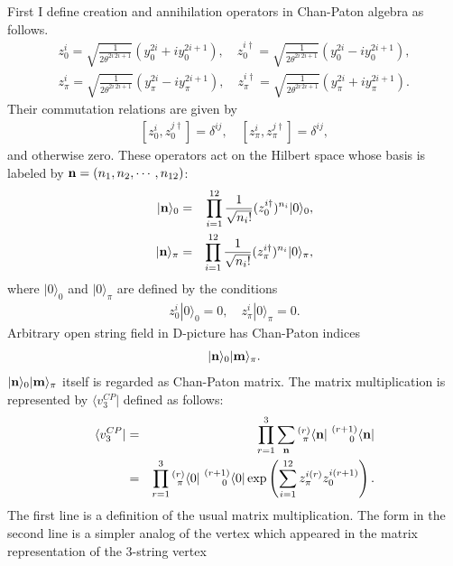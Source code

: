 \documentclass[a4paper,12pt]{article}
\newcommand{\nn}{\nonumber\\}
\def\bra{\langle}
\def\ket{\rangle}
\begin{document}
First I define creation and annihilation
operators in Chan-Paton algebra 
as follows.
\begin{eqnarray}
 \label{zs}
z_0^{i} = 
 \sqrt{\frac{1}{2\theta^{2i\,2i+1}}} 
 \left(
   y^{2i}_0 + i y_0^{2i+1}
 \right), \quad
z^{i \dagger}_0 = 
 \sqrt{\frac{1}{2\theta^{2i\,2i+1}}} 
 \left(
  y^{2i}_0 - i y_0^{2i+1}
 \right), \nn
z_\pi^{i} = 
 \sqrt{\frac{1}{2\theta^{2i\,2i+1}}} 
 \left(
  y^{2i}_\pi - i y_\pi^{2i+1}
 \right), \quad
z^{i \dagger}_\pi =  
 \sqrt{\frac{1}{2\theta^{2i\,2i+1}}} 
  \left(
    y^{2i}_\pi + i y_\pi^{2i+1}
\right).
\end{eqnarray}
Their commutation relations are given by
\begin{eqnarray}
 \label{commz}
[z_0^{i}, z^{j \dagger}_0 ] = \delta^{ij}, 
\quad
[z_\pi^{i}, z^{j \dagger}_\pi ] = \delta^{ij}, 
\end{eqnarray}
and otherwise zero.
These operators act on the
Hilbert space whose basis is
labeled by
${\bf n} = (n_1, n_2, \cdots, n_{12})$:
\begin{eqnarray}
 | {\bf n}\ket_0   
&=& \prod_{i=1}^{12}
\frac{1}{\sqrt{n_i!}} (z_0^{i\dagger})^{n_i}   |0\ket_0 ,
\\
 | {\bf n}\ket_\pi 
&=& \prod_{i=1}^{12}
\frac{1}{\sqrt{n_i!}} (z_\pi^{i\dagger})^{n_i} |0\ket_\pi,
\end{eqnarray}
where $|0\ket_0$ and $|0\ket_\pi$ are
defined by the conditions
\begin{eqnarray}
 z_0^i   |0\ket_0 = 0 , \quad
 z_\pi^i |0\ket_\pi = 0 .
\end{eqnarray}
%
Arbitrary open string field in D-picture
has Chan-Paton indices
\begin{eqnarray}
 \label{CPind}
|{\bf n} \ket_0
|{\bf m} \ket_\pi .
\end{eqnarray}
$|{\bf n} \ket_0|{\bf m} \ket_\pi$
itself is regarded as
Chan-Paton matrix.
The matrix multiplication is
represented by 
$\bra v_3^{CP} |$
defined as follows:
\begin{eqnarray} 
 \label{CPV3}
\bra v_3^{CP} |
&=&
\prod_{r=1}^3
\sum_{{\bf n}}
{}_{\,\,\, \pi}^{(r)}
\bra {\bf n} |\,\,{}^{(r+1)}_{\quad \,\,\,0}
\bra {\bf n} | \nn
&=&
\prod_{r=1}^3 
{}_{\,\,\, \pi}^{(r)}
\bra 0 |\,\,{}^{(r+1)}_{\quad \,\,\,0}\bra 0 |
\exp
\left(
\sum_{i=1}^{12}
 z^{i(r)}_\pi z_0^{i(r+1)} 
\right).
\end{eqnarray}
The first line is a definition
of the usual matrix multiplication.
The form in the
second line is a simpler analog of
the vertex which appeared in the
matrix representation of the 3-string vertex
\end{document}
